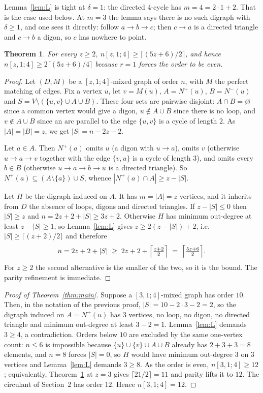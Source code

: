 \documentclass[11pt]{amsart}
\newtheorem{theorem}{Theorem}
\theoremstyle{remark}
\newcommand{\mn}[1]{n[#1]}
\begin{document}
Lemma~\ref{lem:L} is tight at $\delta=1$: the directed $4$-cycle has $m=4=2\cdot
1+2$. That is the case used below. At $m=3$ the lemma says there is no such
digraph with $\delta\ge1$, and one sees it directly: follow $a\to b\to c$; then
$c\to a$ is a directed triangle and $c\to b$ a digon, so $c$ has nowhere to
point.

\begin{theorem}\label{thm:lower}
For every $z\ge2$, $\mn{z,1;4}\ge\lceil(5z+6)/2\rceil$, and hence
$\mn{z,1;4}\ge 2\lceil(5z+6)/4\rceil$ because $r=1$ forces the order to be even.
\end{theorem}

\begin{proof}
Let $(D,M)$ be a $[z,1;4]$-mixed graph of order $n$, with $M$ the perfect
matching of edges. Fix a vertex $u$, let $v=M(u)$, $A=N^+(u)$, $B=N^-(u)$ and
$S=V\setminus(\{u,v\}\cup A\cup B)$. These four sets are pairwise disjoint:
$A\cap B=\varnothing$ since a common vertex would give a digon, $u\notin A\cup B$
since there is no loop, and $v\notin A\cup B$ since an arc parallel to the edge
$\{u,v\}$ is a cycle of length $2$. As $|A|=|B|=z$, we get
$|S|=n-2z-2$.

Let $a\in A$. Then $N^+(a)$ omits $u$ (a digon with $u\to a$), omits $v$
(otherwise $u\to a\to v$ together with the edge $\{v,u\}$ is a cycle of length
$3$), and omits every $b\in B$ (otherwise $u\to a\to b\to u$ is a directed
triangle). So $N^+(a)\subseteq (A\setminus\{a\})\cup S$, whence
$|N^+(a)\cap A|\ge z-|S|$.

Let $H$ be the digraph induced on $A$. It has $m=|A|=z$ vertices, and it
inherits from $D$ the absence of loops, digons and directed triangles. If
$z-|S|\le0$ then $|S|\ge z$ and $n=2z+2+|S|\ge 3z+2$. Otherwise $H$ has
minimum out-degree at least $z-|S|\ge1$, so Lemma~\ref{lem:L} gives
$z\ge 2(z-|S|)+2$, i.e. $|S|\ge\lceil (z+2)/2\rceil$ and therefore
\[
 n=2z+2+|S|\;\ge\;2z+2+\Bigl\lceil\tfrac{z+2}{2}\Bigr\rceil
 \;=\;\Bigl\lceil\tfrac{5z+6}{2}\Bigr\rceil .
\]
For $z\ge2$ the second alternative is the smaller of the two, so it is the
bound. The parity refinement is immediate.
\end{proof}

\begin{proof}[Proof of Theorem~\ref{thm:main}]
Suppose a $[3,1;4]$-mixed graph has order $10$. Then, in the notation of the
previous proof, $|S|=10-2\cdot3-2=2$, so the digraph induced on $A=N^+(u)$ has
$3$ vertices, no loop, no digon, no directed triangle and minimum out-degree at
least $3-2=1$. Lemma~\ref{lem:L} demands $3\ge 4$, a contradiction. Orders
below $10$ are excluded by the same one-vertex count: $n\le 6$ is impossible
because $\{u\}\cup\{v\}\cup A\cup B$ already has $2+3+3=8$ elements, and $n=8$
forces $|S|=0$, so $H$ would have minimum out-degree $3$ on $3$ vertices and
Lemma~\ref{lem:L} demands $3\ge8$. As the order is even, $\mn{3,1;4}\ge12$;
equivalently, Theorem~\ref{thm:lower} at $z=3$ gives
$\lceil 21/2\rceil=11$ and parity lifts it to $12$. The circulant of
Section~2 has order $12$. Hence $\mn{3,1;4}=12$.
\end{proof}
\end{document}
